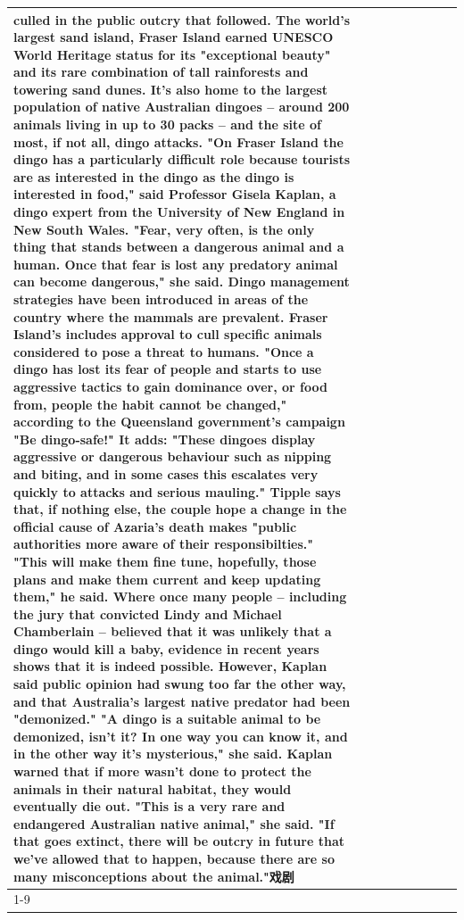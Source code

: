 \begin{table}[H]
\begin{tabular}{lllrlllll}
culled in the public outcry that followed. The world's largest sand island, Fraser Island earned UNESCO World Heritage status for its "exceptional beauty" and its rare combination of tall rainforests and towering sand dunes. It's also home to the largest population of native Australian dingoes -- around 200 animals living in up to 30 packs -- and the site of most, if not all, dingo attacks. "On Fraser Island the dingo has a particularly difficult role because tourists are as interested in the dingo as the dingo is interested in food," said Professor Gisela Kaplan, a dingo expert from the University of New England in New South Wales. "Fear, very often, is the only thing that stands between a dangerous animal and a human. Once that fear is lost any predatory animal can become dangerous," she said. Dingo management strategies have been introduced in areas of the country where the mammals are prevalent. Fraser Island's includes approval to cull specific animals considered to pose a threat to humans. "Once a dingo has lost its fear of people and starts to use aggressive tactics to gain dominance over, or food from, people the habit cannot be changed," according to the Queensland government's campaign "Be dingo-safe!" It adds: "These dingoes display aggressive or dangerous behaviour such as nipping and biting, and in some cases this escalates very quickly to attacks and serious mauling." Tipple says that, if nothing else, the couple hope a change in the official cause of Azaria's death makes "public authorities more aware of their responsibilties." "This will make them fine tune, hopefully, those plans and make them current and keep updating them," he said. Where once many people -- including the jury that convicted Lindy and Michael Chamberlain -- believed that it was unlikely that a dingo would kill a baby, evidence in recent years shows that it is indeed possible. However, Kaplan said public opinion had swung too far the other way, and that Australia's largest native predator had been "demonized." "A dingo is a suitable animal to be demonized, isn't it? In one way you can know it, and in the other way it's mysterious," she said. Kaplan warned that if more wasn't done to protect the animals in their natural habitat, they would eventually die out. "This is a very rare and endangered Australian native animal," she said. "If that goes extinct, there will be outcry in future that we've allowed that to happen, because there are so many misconceptions about the animal."戏剧 \\
\cline{1-9}

\end{tabular}
\end{table}
